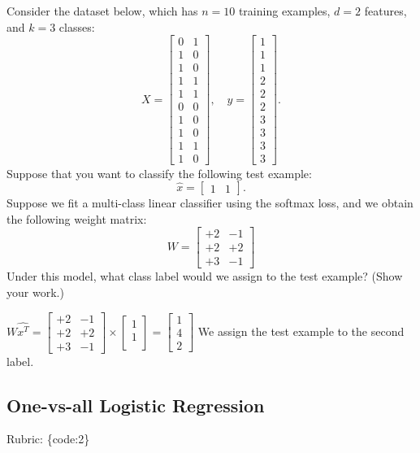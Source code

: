 \documentclass{article}
\def\rubric#1{\gre{Rubric: \{#1\}}}{}
\def\blu#1{{\color{blu}#1}}
\def\gre#1{{\color{gre}#1}}
\begin{document}
Consider the dataset below, which has $n=10$ training examples, $d=2$ features, and $k=3$ classes:
\[
X = \begin{bmatrix}0 & 1\\1 & 0\\ 1 & 0\\ 1 & 1\\ 1 & 1\\ 0 & 0\\  1 & 0\\  1 & 0\\  1 & 1\\  1 &0\end{bmatrix}, \quad y = \begin{bmatrix}1\\1\\1\\2\\2\\2\\3\\3\\3\\3\end{bmatrix}.
\]
Suppose that you want to classify the following test example:
\[
\hat{x} = \begin{bmatrix}1 & 1\end{bmatrix}.
\]
Suppose we fit a multi-class linear classifier using the softmax loss, and we obtain the following weight matrix:
\[
W =
\begin{bmatrix}
+2 & -1\\
+2 & +2\\
+3 & -1
\end{bmatrix}
\]
\blu{Under this model, what class label would we assign to the test example? (Show your work.)}

\blu{$W\hat{x^T}=\begin{bmatrix}
+2 & -1\\
+2 & +2\\
+3 & -1
\end{bmatrix} \times
\begin{bmatrix}
1 \\
1\\
\end{bmatrix}
=\begin{bmatrix}
1 \\
4\\
2
\end{bmatrix}$ We assign the test example to the second label.}
\subsection{One-vs-all Logistic Regression}
\rubric{code:2}
\end{document}
